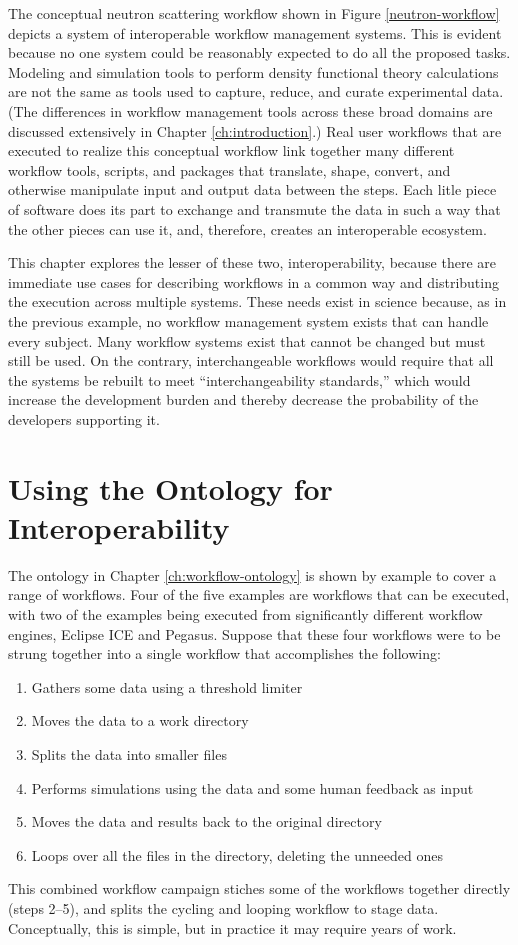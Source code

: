 The conceptual neutron scattering workflow shown in Figure
\ref{neutron-workflow} depicts a system of interoperable workflow management
systems. This is evident because no one system could be reasonably expected to
do all the proposed tasks. Modeling and simulation tools to perform density
functional theory calculations are not the same as tools used to capture,
reduce, and curate experimental data. (The differences in workflow management tools
across these broad domains are discussed extensively in Chapter
\ref{ch:introduction}.) Real user workflows that are executed to realize this
conceptual workflow link together many different workflow tools, scripts, and
packages that translate, shape, convert, and otherwise manipulate input and
output data between the steps. Each litle piece of software does its part to
exchange and transmute the data in such a way that the other pieces can use it,
and, therefore, creates an interoperable ecosystem.

This chapter explores the lesser of these two, interoperability, because there
are immediate use cases for describing workflows in a common way and
distributing the execution across multiple systems. These needs exist in
science because, as in the previous example, no workflow management system
exists that can handle every subject. Many workflow systems exist that cannot be
changed but must still be used. On the contrary, interchangeable workflows
would require that all the systems be rebuilt to meet ``interchangeability
standards,'' which would increase the development burden and thereby decrease
the probability of the developers supporting it.

\section{Using the Ontology for Interoperability}

The ontology in Chapter \ref{ch:workflow-ontology} is shown by example to cover
a range of workflows. Four of the five examples are workflows that can be
executed, with two of the examples being executed from significantly different
workflow engines, Eclipse ICE and Pegasus. Suppose that these four workflows
were to be strung together into a single workflow that accomplishes the
following:
\begin{enumerate}
  \item Gathers some data using a threshold limiter
  \item Moves the data to a work directory
  \item Splits the data into smaller files
  \item Performs simulations using the data and some human feedback as input
  \item Moves the data and results back to the original directory
  \item Loops over all the files in the directory, deleting the unneeded ones
\end{enumerate}
This combined workflow campaign stiches some of the workflows together directly
(steps 2--5), and splits the cycling and looping workflow to stage data.
Conceptually, this is simple, but in practice it may require years of work.

